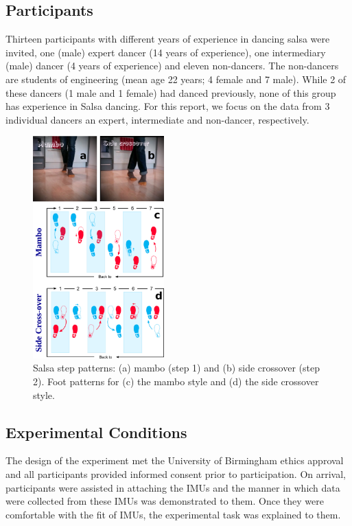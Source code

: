 \documentclass[10pt,journal,compsoc]{IEEEtran}
\begin{document}
\subsection{Participants}
Thirteen participants with different years of experience in
dancing salsa were invited, one (male) expert dancer 
(14 years of experience), one intermediary (male) dancer 
(4 years of experience) and eleven non-dancers. 
The non-dancers are students of engineering 
(mean age 22 years; 4 female and 7 male). 
While 2 of these dancers (1 male and 1 female) had danced previously, 
none of this group has experience in Salsa dancing. 
For this report, we focus on the data from 3 individual dancers 
an expert, intermediate and non-dancer, respectively.
\begin{figure}[!htb]
\centering    
\includegraphics[width=0.45\textwidth]{steps_v00}
\caption[PA]{Salsa step patterns: (a) mambo (step 1) and (b) side crossover
(step 2). Foot patterns for (c) the mambo style and (d) the side crossover style.}
\label{fig:steps}
\end{figure}

\subsection{Experimental Conditions}
The design of the experiment met the University of Birmingham
ethics approval and all participants provided informed consent 
prior to participation. On arrival, participants were assisted 
in attaching the IMUs and the manner in which data were collected 
from these IMUs was demonstrated to them. 
Once they were comfortable with the fit of IMUs, the experimental 
task was explained to them.
\end{document}
